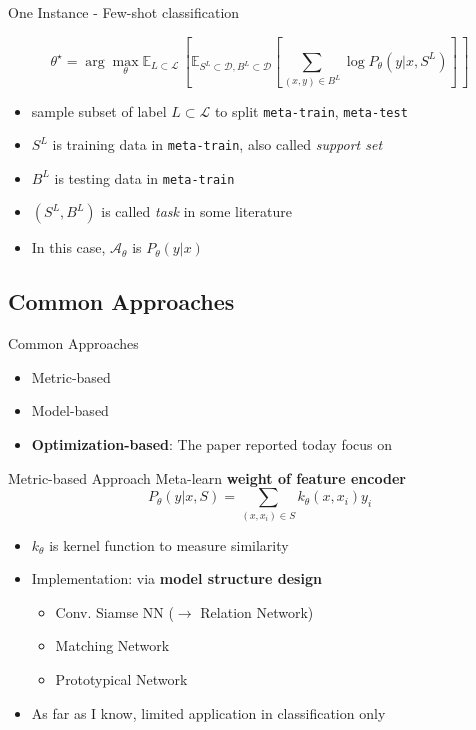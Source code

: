 \documentclass{beamer}
\begin{document}
\begin{frame}{One Instance - Few-shot classification}

  \[ \theta^\star = \arg \max_\theta \mathbb{E}_{L \subset \mathcal{L}} \, [ \mathbb{E}_{S^L \subset \mathcal{D}, B^L \subset \mathcal{D}}[\sum_{(x,y) \in B^L} \log P_\theta(y|x,S^L)] \,  ]\]

  \begin{itemize}
    \item sample subset of label $L \subset \mathcal{L}$ to split \texttt{meta-train}, \texttt{meta-test}
    \item $S^L$ is training data in \texttt{meta-train}, also called \textit{support set}
    \item $B^L$ is testing data in \texttt{meta-train}
    \item $(S^L, B^L)$ is called \textit{task} in some literature
    \item In this case, $\mathcal{A}_\theta$ is $P_\theta(y|x)$
  \end{itemize}
\end{frame}

\subsection{Common Approaches}
\begin{frame}{Common Approaches}
  \begin{itemize}
    \item Metric-based
    \item Model-based
    \item \textbf{Optimization-based}: The paper reported today focus on
  \end{itemize}
\end{frame}

\begin{frame}{Metric-based Approach}
  Meta-learn \textbf{weight of feature encoder}
  \[ P_\theta (y|x,S) = \sum_{(x,x_i) \in S} k_\theta (x,x_i) y_i \]
  \begin{itemize}
    \item $k_\theta$ is kernel function to measure similarity
    \item Implementation: via \textbf{model structure design}
      \begin{itemize}
        \item Conv. Siamse NN ($\rightarrow$ Relation Network)
        \item Matching Network
        \item Prototypical Network
      \end{itemize}
    \item As far as I know, limited application in classification only
  \end{itemize}
\end{frame}
\end{document}
